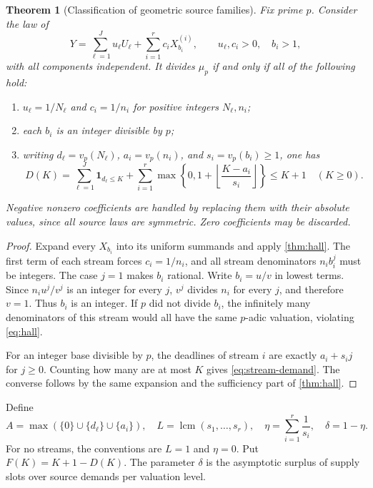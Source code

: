 \documentclass[11pt,a4paper]{article}
\newtheorem{theorem}{Theorem}[section]
\theoremstyle{remark}
\newcommand{\lcm}{\operatorname{lcm}}
\newcommand{\ind}{\mathbf 1}
\begin{document}
\begin{theorem}[Classification of geometric source families]
\label{thm:streams}
Fix prime $p$. Consider the law of
\begin{equation}
 Y=\sum_{\ell=1}^{J}u_\ell U_\ell+
   \sum_{i=1}^{r}c_iX_{b_i}^{(i)},
 \qquad u_\ell,c_i>0,\quad b_i>1,
 \label{eq:streams}
\end{equation}
with all components independent. It divides $\mu_p$ if and only if all of the
following hold:
\begin{enumerate}[label=\textup{(\alph*)}]
\item $u_\ell=1/N_\ell$ and $c_i=1/n_i$ for positive integers $N_\ell,n_i$;
\item each $b_i$ is an integer divisible by $p$;
\item writing $d_\ell=v_p(N_\ell)$, $a_i=v_p(n_i)$, and
$s_i=v_p(b_i)\ge1$, one has
\begin{equation}
 D(K)=\sum_{\ell=1}^{J}\ind_{d_\ell\le K}
      +\sum_{i=1}^{r}\max\left\{0,1+\left\lfloor\frac{K-a_i}{s_i}\right\rfloor\right\}
      \le K+1
 \quad(K\ge0).
 \label{eq:stream-demand}
\end{equation}
\end{enumerate}
Negative nonzero coefficients are handled by replacing them with their absolute
values, since all source laws are symmetric. Zero coefficients may be discarded.
\end{theorem}
\begin{proof}
Expand every $X_{b_i}$ into its uniform summands and apply \cref{thm:hall}.
The first term of each stream forces $c_i=1/n_i$, and all stream denominators
$n_ib_i^j$ must be integers. The case $j=1$ makes $b_i$ rational. Write
$b_i=u/v$ in lowest terms. Since $n_iu^j/v^j$ is an integer for every $j$,
$v^j$ divides $n_i$ for every $j$, and therefore $v=1$. Thus $b_i$ is an integer.
If $p$ did not divide $b_i$, the infinitely many denominators of this stream
would all have the same $p$-adic valuation, violating \eqref{eq:hall}.

For an integer base divisible by $p$, the deadlines of stream $i$ are exactly
$a_i+s_ij$ for $j\ge0$. Counting how many are at most $K$ gives
\eqref{eq:stream-demand}. The converse follows by the same expansion and the
sufficiency part of \cref{thm:hall}.
\end{proof}

Define
\begin{equation}
 A=\max(\{0\}\cup\{d_\ell\}\cup\{a_i\}),\quad
 L=\lcm(s_1,\ldots,s_r),\quad
 \eta=\sum_{i=1}^{r}\frac1{s_i},\quad \delta=1-\eta.
 \label{eq:density}
\end{equation}
For no streams, the conventions are $L=1$ and $\eta=0$. Put
$F(K)=K+1-D(K)$. The parameter $\delta$ is the asymptotic surplus of supply
slots over source demands per valuation level.
\end{document}
